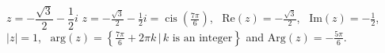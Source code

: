 { $z = -\dfrac{\sqrt{3}}{2} - \dfrac{1}{2}i$}
{ $z = -\frac{\sqrt{3}}{2} - \frac{1}{2}i = \operatorname{cis}\left(\frac{7\pi}{6}\right)$, \, $\text{Re}(z) = -\frac{\sqrt{3}}{2}$, \, $\text{Im}(z) = -\frac{1}{2}$, \, $|z| = 1$, \, $\text{arg}(z) = \left\{\frac{7\pi}{6} + 2\pi k \, | \, \text{$k$ is an integer} \right\}$ and $\text{Arg}(z) = -\frac{5\pi}{6}$.}
